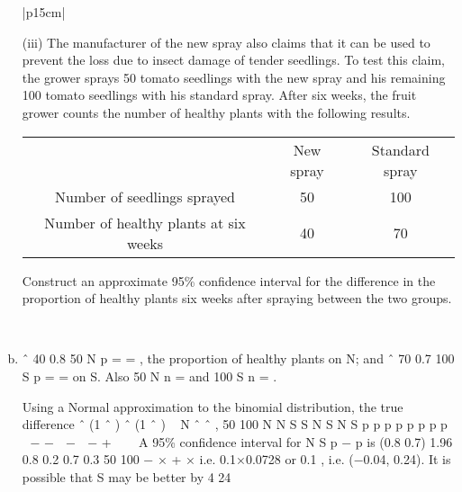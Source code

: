 \documentclass[a4paper,12pt]{article}
\begin{document}
\begin{enumerate}[(a)]
\begin{table}[ht!]
 
\centering
 
\begin{tabular}{|p{15cm}|}
 
\hline  

(iii) The manufacturer of the new spray also claims that it can be used to prevent the loss due to insect damage of tender seedlings.  To test this claim, the grower sprays 50 tomato seedlings with the new spray and his remaining 100 tomato seedlings with his standard spray.  After six weeks, the fruit grower counts the number of healthy plants with the following results. 
\begin{center}
\begin{tabular}{ccc} 
 & New spray& Standard spray \\
 Number of seedlings  sprayed & 50 & 100 \\
 Number of healthy plants at six weeks&  40&  70 \\
\end{tabular}
\end{center}
Construct an approximate 95\% confidence interval for the difference in the proportion of healthy plants six weeks after spraying between the two groups. 
 

\\ \hline
  
\end{tabular}

\end{table} 
\item  ˆ 40 0.8
50 N p = = , the proportion of healthy plants on N; and ˆ 70 0.7
100 S p = = on
S. Also 50 N n = and 100 S n = . 

Using a Normal approximation to the binomial distribution, the true difference ˆ (1 ˆ ) ˆ (1 ˆ )
~ N ˆ ˆ ,
50 100
N N S S
N S N S
p p p p
p p p p
 − − 
−  − + 
 
A 95\% confidence interval for N S p − p is (0.8 0.7) 1.96 0.8 0.2 0.7 0.3
50 100
− \pm  × + ×
i.e. 0.1×0.0728 or 0.1 , i.e. (−0.04, 0.24).
It is possible that S may be better by 4%
24%
\end{enumerate}
\end{document}
